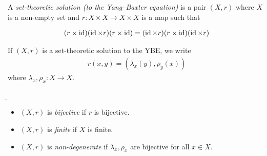     \begin{definition}
        A \emph{set-theoretic solution (to the Yang--Baxter equation)} is a pair $(X,r)$ where $X$ is a non-empty set and $r: X\times X \to X \times X$ is a map such that
        
        \begin{align*}
            (r\times \operatorname{id})(\operatorname{id} \times r)(r\times \operatorname{id}) = (\operatorname{id} \times r)(r\times \operatorname{id})(\operatorname{id} \times r)
        \end{align*}
    \end{definition}
    
    \begin{convention}
        If $(X,r)$ is a set-theoretic solution to the YBE, we write 
        \begin{align*}
            r(x,y) = (\lambda_x(y),\rho_y(x))        
        \end{align*}
        where $\lambda_x,\rho_x:X\to X$.
    \end{convention}


    \b
        \begin{itemize}
            \item $(X,r)$ is \emph{bijective} if $r$ is bijective.
            \item $(X,r)$ is \emph{finite} if $X$ is finite.
            \item $(X,r)$ is \emph{non-degenerate} if $\lambda_x,\rho_x$ are bijective for all $x\in X$.
        \end{itemize}




    

